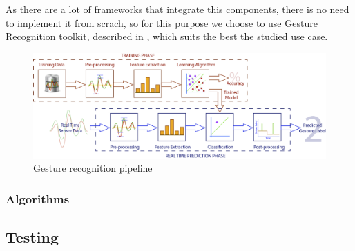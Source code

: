 As there are a lot of frameworks that integrate this components, there is no need to implement it from scrach, so for this purpose we choose to use Gesture Recognition toolkit, described in \cite{Gillian-2014}, which suits the best the studied use case.

\begin{figure}
	\centering\includegraphics[width=12.5cm]{src/img/GestureRecognitionPipelineImage-01.jpg}
	\caption{Gesture recognition pipeline}
	\label{fig:1}
\end{figure}

\subsubsection{Algorithms}


\subsection{Testing}


